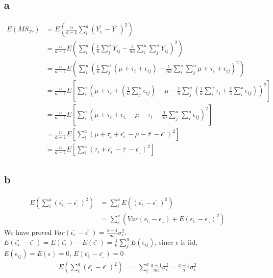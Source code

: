 \documentclass[11pt,letterpaper]{article}
\begin{document}
\subsection*{a}
\begin{align*}
E(MS_{Tr}) &= E(\frac{n}{a-1} \sum_i^a (\bar{Y_{i.}} - \bar{Y_{..}})^2 ) \\
&= \frac{n}{a-1} E(\sum_i^a (\frac{1}{n} \sum_j^n Y_{ij}  - \frac{1}{na} \sum_i^a \sum_j^n Y_{ij} )^2 ) \\
&= \frac{n}{a-1} E(\sum_i^a (\frac{1}{n} \sum_j^n (\mu + \tau_i +  \epsilon_{ij}) -  \frac{1}{na} \sum_i^a \sum_j^n \mu + \tau_i + \epsilon_{ij} )^2 ) \\
&= \frac{n}{a-1} E[ \sum_i^a (\mu + \tau_i + (\frac{1}{n} \sum_j^n  \epsilon_{ij}) - \mu - \frac{1}{n} \sum_j^n ( \frac{1}{a}\sum_i^a \tau_i + \frac{1}{a} \sum_i^a  \epsilon_{ij} ) )^2 ] \\
&= \frac{n}{a-1} E[ \sum_i^a (\mu + \tau_i + \bar{\epsilon_{i.}} - \mu - \bar{\tau_i} - \frac{1}{an} \sum_j^n \sum_i^a  \epsilon_{ij} )^2 ] \\
&= \frac{n}{a-1} E[ \sum_i^a (\mu + \tau_i + \bar{\epsilon_{i.}} - \mu - \bar{\tau_.} - \bar{\epsilon_{..}} )^2 ] \\
&= \frac{n}{a-1} E[ \sum_i^a ( \tau_i + \bar{\epsilon_{i.}} - \bar{\tau_.} - \bar{\epsilon_{..}} )^2 ] 
\end{align*}

\subsection*{b}
\begin{align*}
E(\sum_i^a (\bar{\epsilon_{i.}} - \bar{\epsilon_{..}})^2 ) &= \sum_i^aE( (\bar{\epsilon_{i.}} - \bar{\epsilon_{..}})^2 ) \\
&= \sum_i^a (Var( \bar{\epsilon_{i.}} - \bar{\epsilon_{..}})  + E(\bar{\epsilon_{i.}} - \bar{\epsilon_{..}})^2) 
\end{align*}
\noindent We have proved $Var(\bar{\epsilon_{i.}} - \bar{\epsilon_{..}}) = \frac{a-1}{na} \sigma_{\epsilon}^2$. \\

\noindent $E(\bar{\epsilon_{i.}} - \bar{\epsilon_{..}} ) = E(\bar{\epsilon_{i.}}) - E( \bar{\epsilon_{..}}) = \frac{1}{n} \sum_j^n E(\epsilon_{ij})$, since $\epsilon$ is iid, $E(\epsilon_{ij}) = E(\epsilon) = 0$, $E(\bar{\epsilon_{i.}} - \bar{\epsilon_{..}}) = 0$
\begin{align*}
E(\sum_i^a (\bar{\epsilon_{i.}} - \bar{\epsilon_{..}})^2 ) &= \sum_i^a \frac{a-1}{na} \sigma_{\epsilon}^2 = \frac{a-1}{n} \sigma_{\epsilon}^2
\end{align*}
\end{document}
